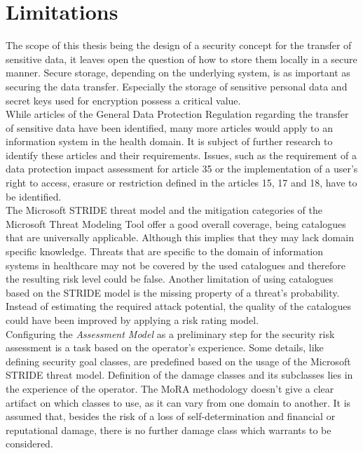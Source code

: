 \section{Limitations}
\label{limitations}
The scope of this thesis being the design of a security concept for the transfer of sensitive data, it leaves open the question of how to store them locally in a secure manner. Secure storage, depending on the underlying system, is as important as securing the data transfer. Especially the storage of sensitive personal data and secret keys used for encryption possess a critical value.\\
\newline
While articles of the General Data Protection Regulation regarding the transfer of sensitive data have been identified, many more articles would apply to an information system in the health domain. It is subject of further research to identify these articles and their requirements. Issues, such as the requirement of a data protection impact assessment for article 35\cite{GDPR35} or the implementation of a user's right to access, erasure or restriction defined in the articles 15\cite{GDPR15}, 17\cite{GDPR17} and 18\cite{GDPR18}, have to be identified.\\
\newline
The Microsoft STRIDE threat model and the mitigation categories of the Microsoft Threat Modeling Tool offer a good overall coverage, being catalogues that are universally applicable. Although this implies that they may lack domain specific knowledge. Threats that are specific to the domain of information systems in healthcare may not be covered by the used catalogues and therefore the resulting risk level could be false. Another limitation of using catalogues based on the STRIDE model is the missing property of a threat's probability. Instead of estimating the required attack potential, the quality of the catalogues could have been improved by applying a risk rating model.\\
\newline
Configuring the \textit{Assessment Model} as a preliminary step for the security risk assessment is a task based on the operator’s experience. Some details, like defining security goal classes, are predefined based on the usage of the Microsoft STRIDE threat model. Definition of the damage classes and its subclasses lies in the experience of the operator. The MoRA methodology doesn't give a clear artifact on which classes to use, as it can vary from one domain to another. It is assumed that, besides the risk of a loss of self-determination and financial or reputational damage, there is no further damage class which warrants to be considered.\\


